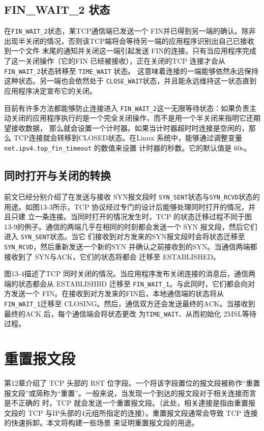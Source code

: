 \subsection{ FIN\_WAIT\_2 状态}
在\verb|FIN_WAIT_2|状态，某TCP通信端已发送一个 FIN并已得到另一端的确认。除非出现半关闭的情况，否则该TCP端将会等待另一端的应用程序识别出自己已接收到一个文件
末尾的通知并关闭这一端引起发送 FIN的连接。只有当应用程序完成了这一关闭操作（它的FIN 已经被接收），正在关闭的TCP 连接才会从 \verb|FIN_WAIT_2|状态转移至 \verb|TIME_WAIT| 状态。
这意味着连接的一端能够依然永远保持这种状态。另一端也会依然处于 \verb|CLOSE_WAIT|状态，并且能永远维持这一状态直到应用程序决定宣布它的关闭。

目前有许多方法都能够防止连接进入 \verb|FIN_WAIT_2|这一无限等待状态：如果负责主动关闭的应用程序执行的是一个完全关闭操作，而不是用一个半关闭来指明它还期望接收数据，
那么就会设置一个计时器。如果当计时器超时时连接是空闲的，那么 TCP连接就会转移到CLOSED状态。在Linux 系统中，能够通过调整变量 \verb|net.ipv4.top_fin_timeout| 的数值来设置
计时器的秒数。它的默认值是 60s。
\subsection{同时打开与关闭的转换}
前文已经分别介绍了在发送与接收 SYN报文段时 \verb|SYN_SENT|状态与\verb|SYN_RCVD|状态的用途。如图13-3所示，TCP 协议经过专门的设计后能够处理同时打开的情况，并且只建
立一条连接。当同时打开的情况发生时，TCP 的状态迁移过程不同于图13-9的例子。通信的两端几乎在相同的时刻都会发送一个 SYN 报文段，然后它们进入 \verb|SYN_SENT|状态。当它
们接收到对方发来的SYN报文段时会将状态迁移至\verb|SYN_RCVD|，然后重新发送一个新的SYN 并确认之前接收到的SYN。当通信两端都接收到了 SYN与ACK，它们的状态将都会
迁移至 ESTABLISHED。

图13-4描述了TCP 同时关闭的情况。当应用程序发布关闭连接的消息后，通信两端的状态都会从 ESTABLISHBD 迁移至 \verb|FIN_WAIT_1|。与此同时，它们都会向对方发送一个
FIN。在接收到对方发来的FIN后，本地通信端的状态将从 \verb|FIN_WAIT_1|迁移至 CLOSING。然后，通信双方还会发送最终的ACK。当接收到最终的ACK 后，每个通信端会将状态更改
为\verb|TIME_WAIT|、从而初始化 2MSL等待过程。
\section{重置报文段}
第12章介绍了 TCP 头部的 RST 位字段。一个将该字段置位的报文段被称作“重置报文段”或简称为“重置”。一般来说，当发现一个到达的报文段对于相关连接而言是不正确的
时，TCP 就会发送一个重置报文段。（此处，相关達接是指由重置报文段的 TCP 与IP头部的4元组所指定的连接）。重置报文段通常会导致 TCP 连接的快速拆卸。本文将构建一些场景
来证明重置报文段的用途。
